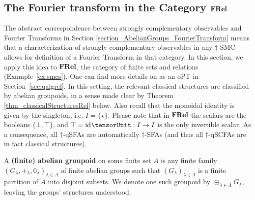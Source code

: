 \subsection{The Fourier transform in the Category $\mathbf{FRel}$}
\label{section_RelFT}


The abstract correspondence between strongly complementary observables and Fourier Transforms in Section \ref{section_AbelianGroups_FourierTransform} means that a characterization of strongly complementary observables in any $\dagger$-SMC allows for definition of a Fourier Transform in that category.  In this section, we apply this idea to $\mathbf{FRel}$, the category of finite sets and relations (Example~\ref{ex:smcs}). One can find more details on  as an oPT in Section~\ref{sec:qalgrel}. In this setting, the relevant classical structures are classified by abelian groupoids, in a sense made clear by Theorem \ref{thm_classicalStructuresRel} below. Also recall that the monoidal identity is given by the singleton, i.e. $I = \{\star\}$. Please note that in $\mathbf{FRel}$ the scalars are the booleans $\{\bot,\top\}$, and $\top = \id{\tensorUnit}: I \rightarrow I$ is the only invertible scalar. As a consequence, all $\dagger$-qSFAs are automatically $\dagger$-SFAs (and thus all $\dagger$-qSCFAs are in fact classical structures). 

\begin{defn}
A \textbf{(finite) abelian groupoid} on some finite set $A$ is any finite family $(G_\lambda,+_\lambda,0_\lambda)_{\lambda \in \Lambda}$ of finite abelian groups such that $(G_\lambda)_{\lambda \in \Lambda}$ is a finite partition of $A$ into disjoint subsets. We denote one such groupoid by $\oplus_{\lambda \in \Lambda} G_\lambda$, leaving the groups' structures understood.
\end{defn}

